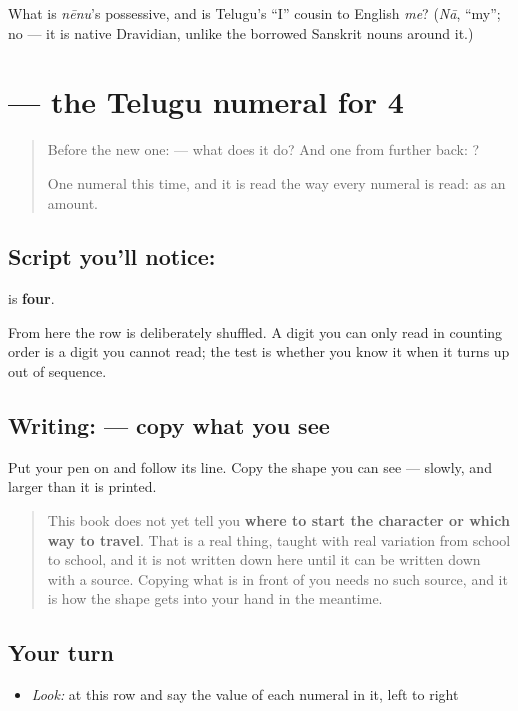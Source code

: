 \begin{tcolorbox}[breakable,colback=teal!4,colframe=teal!35!black,title={Before you move on}]
What is \emph{nēnu}'s possessive, and is Telugu's \textquotedblleft{}I\textquotedblright{} cousin to English \emph{me}? (\emph{Nā}, \textquotedblleft{}my\textquotedblright{}; no — it is native Dravidian, unlike the borrowed Sanskrit nouns around it.)
\end{tcolorbox}
\section[\texorpdfstring{\te{౪} (4)}{౪ (4)}]{ — the Telugu numeral for 4}

\label{lesson:TE-S143-digit-4}



\begin{quote}
Before the new one:  — what does it do? And one from further back: ?

One numeral this time, and it is read the way every numeral is read: as an amount.
\end{quote}

\subsection*{Script you'll notice: }
\textbf{} is \textbf{four}.

From here the row is deliberately shuffled. A digit you can only read in counting order is a digit you cannot read; the test is whether you know it when it turns up out of sequence.

\subsection*{Writing:  — copy what you see}
Put your pen on  and follow its line. Copy the shape you can see — slowly, and larger than it is printed.

\begin{quote}
This book does not yet tell you \textbf{where to start the character or which way to travel}. That is a real thing, taught with real variation from school to school, and it is not written down here until it can be written down with a source. Copying what is in front of you needs no such source, and it is how the shape gets into your hand in the meantime.
\end{quote}

\subsection*{Your turn}
\begin{itemize}
\raggedright
  \item \emph{Look:} at this row and say the value of each numeral in it, left to right
\end{itemize}

